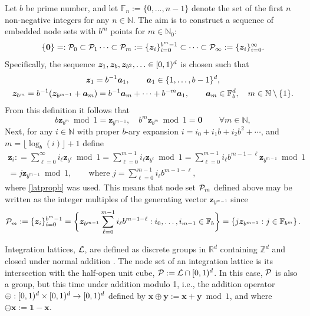 \documentclass[graybox]{svmult}
\newcommand{\Z}{\mathbb{Z}} %
\newcommand{\R}{\mathbb{R}} %
\newcommand{\N}{\mathbb{N}} %
\newcommand{\F}{\mathbb{F}} %
\newcommand{\bszero}{\boldsymbol{0}} %
\newcommand{\bsone}{\boldsymbol{1}}  %
\newcommand{\bsx}{\boldsymbol{x}}    %
\newcommand{\bsy}{\boldsymbol{y}}    %
\newcommand{\bsz}{\boldsymbol{z}}    %
\begin{document}
Let $b$ be prime number, and let $\F_{n}:=\{0, \ldots, n-1\}$ denote the set of the first $n$ non-negative integers for any $n \in \N$. The aim is to construct a sequence of embedded node sets with $b^m$ points for $m \in \N_0$:
\[
\{\bszero\}=:\cp_0\subset \cp_1 \dots\subset\cp_m:=\{\bsz_i\}_{i=0}^{b^m-1} \subset\dots\subset\cp_\infty:=\{\bsz_i\}_{i=0}^{\infty}.
\]
Specifically, the sequence $\bsz_1, \bsz_b, \bsz_{b^2},  \ldots \in \cube$ is chosen such that 
\begin{subequations} \label{zbmdef}
\begin{gather} 
\bsz_1 = b^{-1} \bsa_1, \qquad \bsa_1 \in \{1, \ldots, b-1\}^{d}, \\
\bsz_{b^m} = b^{-1}(\bsz_{b^{m-1}}+\bsa_m)= b^{-1}\bsa_m + \cdots + b^{-m} \bsa_1, \qquad \bsa_m \in \F_b^{d}, \quad m \in \N\setminus\{1\}.
\end{gather}
\end{subequations}
From this definition it follows that
\begin{equation} 
b\bsz_{b^m} \bmod {1} =\bsz_{b^{m-1}}, \quad b^{m}\bsz_{b^{m}} \bmod {1} = \bszero \qquad \forall m \in \N ,\label{latpropb}
\end{equation}
Next, for any $i \in \N$ with proper $b$-ary expansion $i=i_0+i_1 b + i_2 b^2 + \cdots$, and $m=\lfloor \log_b(i) \rfloor+1$ define 
\begin{multline} \label{zidef}
\bsz_i : = \sum_{\ell=0}^{\infty} i_\ell \bsz_{b^\ell} \bmod 1 = \sum_{\ell=0}^{m-1} i_\ell \bsz_{b^\ell} \bmod 1 = \sum_{\ell=0}^{m-1} i_\ell b^{m-1-\ell}  \bsz_{b^{m-1}} \bmod 1 \\ 
 = j \bsz_{b^{m-1}} \bmod 1, \qquad \text{where } j= \sum_{\ell=0}^{m-1} i_\ell b^{m-1-\ell},
\end{multline}
where \eqref{latpropb} was used.  This means that node set $\mathcal{P}_m$ defined above may be written as the integer multiples of the generating vector $\bsz_{b^{m-1}}$ since 
\[
\cp_m:= \{\bsz_i\}_{i=0}^{b^m-1} = \bigg \{ \bsz_{b^{m-1}} \sum_{\ell=0}^{m-1} i_\ell b^{m-1-\ell} : i_0, \ldots , i_{m-1} \in \F_b \bigg \} = \left\{ j \bsz_{b^{m-1}} : j \in \F_{b^m} \right \}.
\]

Integration lattices, $\mathcal{L}$, are defined as discrete groups in $\R^d$ containing $\Z^d$ and closed under normal addition \cite[Sec. 2.7-2.8]{SloJoe94}.  The node set of an integration lattice is its intersection with the half-open unit cube, $\mathcal{P}:=\mathcal{L} \cap [0,1)^d$. In this case, $\mathcal{P}$ is also a group, but this time under addition modulo 1, i.e., the addition operator $\oplus:[0,1)^d \times [0,1)^d \to [0,1)^d$ defined by $\bsx\oplus\bsy:=\bsx+\bsy\bmod 1$, and where $\ominus \bsx:=\bsone-\bsx$.
\end{document}
